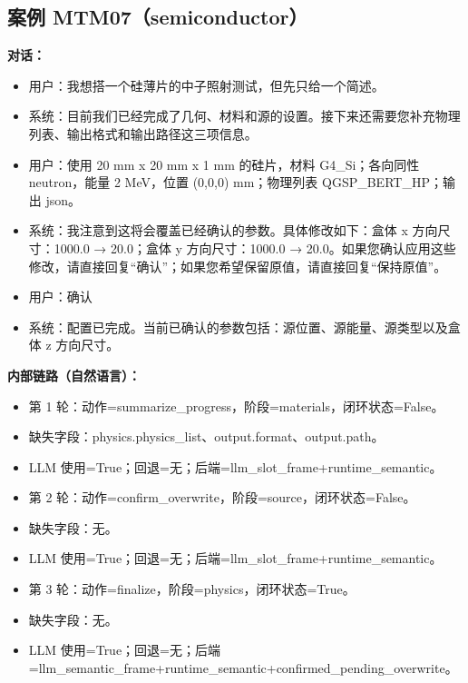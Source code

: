 \documentclass[11pt]{ctexart}
\begin{document}
\subsection{案例 MTM07（semiconductor）}
\textbf{对话：}
\begin{itemize}
\item 用户：我想搭一个硅薄片的中子照射测试，但先只给一个简述。
\item 系统：目前我们已经完成了几何、材料和源的设置。接下来还需要您补充物理列表、输出格式和输出路径这三项信息。
\item 用户：使用 20 mm x 20 mm x 1 mm 的硅片，材料 G4\_Si；各向同性 neutron，能量 2 MeV，位置 (0,0,0) mm；物理列表 QGSP\_BERT\_HP；输出 json。
\item 系统：我注意到这将会覆盖已经确认的参数。具体修改如下：盒体 x 方向尺寸：1000.0 → 20.0；盒体 y 方向尺寸：1000.0 → 20.0。如果您确认应用这些修改，请直接回复“确认”；如果您希望保留原值，请直接回复“保持原值”。
\item 用户：确认
\item 系统：配置已完成。当前已确认的参数包括：源位置、源能量、源类型以及盒体 z 方向尺寸。
\end{itemize}
\textbf{内部链路（自然语言）：}
\begin{itemize}
\item 第 1 轮：动作=summarize\_progress，阶段=materials，闭环状态=False。
\item 缺失字段：physics.physics\_list、output.format、output.path。
\item LLM 使用=True；回退=无；后端=llm\_slot\_frame+runtime\_semantic。
\item 第 2 轮：动作=confirm\_overwrite，阶段=source，闭环状态=False。
\item 缺失字段：无。
\item LLM 使用=True；回退=无；后端=llm\_slot\_frame+runtime\_semantic。
\item 第 3 轮：动作=finalize，阶段=physics，闭环状态=True。
\item 缺失字段：无。
\item LLM 使用=True；回退=无；后端=llm\_semantic\_frame+runtime\_semantic+confirmed\_pending\_overwrite。
\end{itemize}
\end{document}
